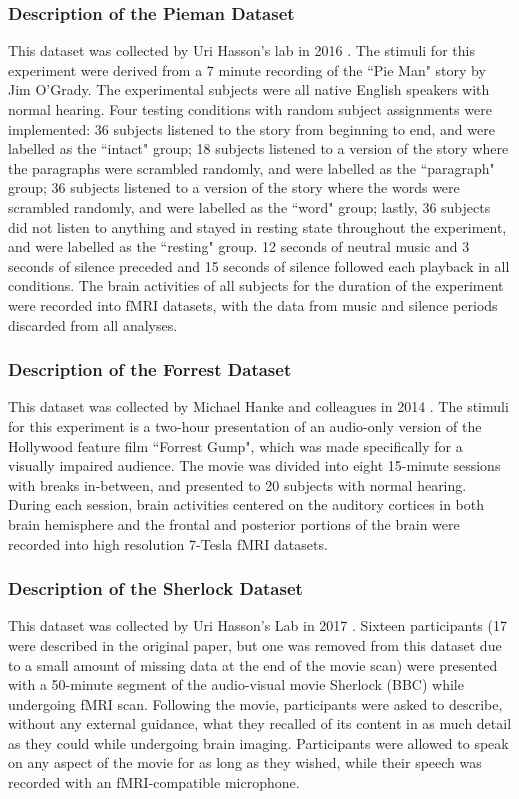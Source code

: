 \documentclass[11pt]{article}
\begin{document}
\subsubsection{Description of the Pieman Dataset}
This dataset was collected by Uri Hasson's lab in 2016 \citep{hasson2016}. The stimuli for this experiment were derived from a 7 minute recording of the ``Pie Man" story by Jim O'Grady. The experimental subjects were all native English speakers with normal hearing. Four testing conditions with random subject assignments were implemented: 36 subjects listened to the story from beginning to end, and were labelled as the ``intact" group; 18 subjects listened to a version of the story where the paragraphs were scrambled randomly, and were labelled as the ``paragraph" group; 36 subjects listened to a version of the story where the words were scrambled randomly, and were labelled as the ``word" group; lastly, 36 subjects did not listen to anything and stayed in resting state throughout the experiment, and were labelled as the ``resting" group. 12 seconds of neutral music and 3 seconds of silence preceded and 15 seconds of silence followed each playback in all conditions. The brain activities of all subjects for the duration of the experiment were recorded into fMRI datasets, with the data from music and silence periods discarded from all analyses.

\subsubsection{Description of the Forrest Dataset}
This dataset was collected by Michael Hanke and colleagues in 2014 \citep{Hanke2014}. The stimuli for this experiment is a two-hour presentation of an audio-only version of the Hollywood feature film ``Forrest Gump", which was made specifically for a visually impaired audience. The movie was divided into eight 15-minute sessions with breaks in-between, and presented to 20 subjects with normal hearing. During each session, brain activities centered on the auditory cortices in both brain hemisphere and the frontal and posterior portions of the brain were recorded into high resolution 7-Tesla fMRI datasets.

\subsubsection{Description of the Sherlock Dataset}
This dataset was collected by Uri Hasson's Lab in 2017 \citep{Chen2017}. Sixteen participants (17 were described in the original paper, but one was removed from this dataset due to a small amount of missing data at the end of the movie scan) were presented with a 50-minute segment of the audio-visual movie Sherlock (BBC) while undergoing fMRI scan. Following the movie, participants were asked to describe, without any external guidance, what they recalled of its content in as much detail as they could while undergoing brain imaging. Participants were allowed to speak on any aspect of the movie for as long as they wished, while their speech was recorded with an fMRI-compatible microphone.
\end{document}

